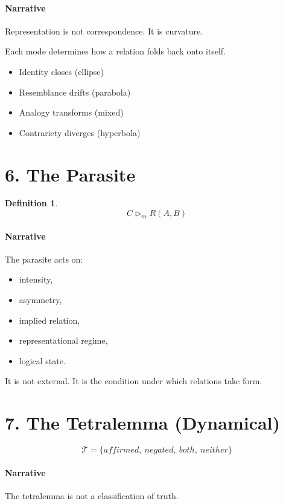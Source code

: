 \documentclass[11pt]{article}
\newtheorem{definition}{Definition}
\begin{document}
\paragraph{Narrative}
Representation is not correspondence.
It is curvature.

Each mode determines how a relation folds back onto itself.

\begin{itemize}
\item Identity closes (ellipse)
\item Resemblance drifts (parabola)
\item Analogy transforms (mixed)
\item Contrariety diverges (hyperbola)
\end{itemize}

\section{6. The Parasite}

\begin{definition}
\[
C \triangleright_m R(A,B)
\]
\end{definition}

\paragraph{Narrative}
The parasite acts on:
\begin{itemize}
\item intensity,
\item asymmetry,
\item implied relation,
\item representational regime,
\item logical state.
\end{itemize}

It is not external.
It is the condition under which relations take form.

\section{7. The Tetralemma (Dynamical)}

\[
\mathcal{T} = \{affirmed,\ negated,\ both,\ neither\}
\]

\paragraph{Narrative}
The tetralemma is not a classification of truth.
\end{document}
